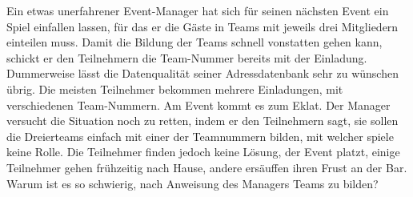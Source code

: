 Ein etwas unerfahrener Event-Manager hat sich für seinen nächsten
Event ein Spiel einfallen lassen, für das er die Gäste in
Teams mit jeweils drei Mitgliedern einteilen muss. 
Damit die Bildung der Teams schnell vonstatten gehen kann, schickt
er den Teilnehmern die Team-Nummer bereits mit der Einladung.
Dummerweise lässt die Datenqualität seiner Adressdatenbank
sehr zu wünschen übrig. Die meisten Teilnehmer bekommen mehrere
Einladungen, mit verschiedenen Team-Nummern. Am Event kommt es zum Eklat.
Der Manager versucht die Situation noch zu retten, indem er den
Teilnehmern sagt, sie sollen die Dreierteams einfach mit einer
der Teamnummern bilden, mit welcher spiele keine Rolle. Die Teilnehmer
finden jedoch keine Lösung, der Event platzt, einige Teilnehmer 
gehen frühzeitig nach Hause, andere ersäuffen ihren Frust an der Bar.
Warum ist es so schwierig, nach Anweisung des Managers Teams zu bilden?

